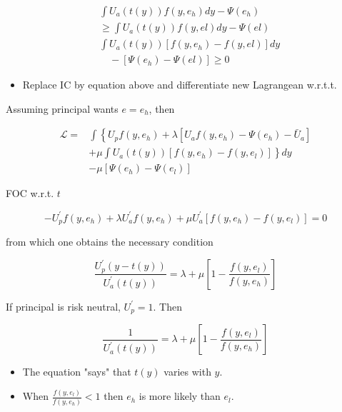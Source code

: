 \documentclass[10pt]{article}
\begin{document}
$$
\begin{aligned}
& \int U_{a}(t(y)) f\left(y, e_{h}\right) d y-\Psi\left(e_{h}\right) \\
& \geq \int U_{a}(t(y)) f(y, e l) d y-\Psi(e l) \\
& \int U_{a}(t(y))\left[f\left(y, e_{h}\right)-f(y, e l)\right] d y \\
& \quad-\left[\Psi\left(e_{h}\right)-\Psi(e l)\right] \geq 0
\end{aligned}
$$

\begin{itemize}
  \item Replace IC by equation above and differentiate new Lagrangean w.r.t.t.
\end{itemize}

Assuming principal wants $e=e_{h}$, then

$$
\begin{aligned}
\mathcal{L}= & \int\left\{U_{p} f\left(y, e_{h}\right)+\lambda\left[U_{a} f\left(y, e_{h}\right)-\Psi\left(e_{h}\right)-\bar{U}_{a}\right]\right. \\
& \left.+\mu \int U_{a}(t(y))\left[f\left(y, e_{h}\right)-f\left(y, e_{l}\right)\right]\right\} d y \\
& -\mu\left[\Psi\left(e_{h}\right)-\Psi\left(e_{l}\right)\right]
\end{aligned}
$$

FOC w.r.t. $t$

$$
-U_{p}^{\prime} f\left(y, e_{h}\right)+\lambda U_{a}^{\prime} f\left(y, e_{h}\right)+\mu U_{a}^{\prime}\left[f\left(y, e_{h}\right)-f\left(y, e_{l}\right)\right]=0
$$

from which one obtains the necessary condition

$$
\frac{U_{p}^{\prime}(y-t(y))}{U_{a}^{\prime}(t(y))}=\lambda+\mu\left[1-\frac{f\left(y, e_{l}\right)}{f\left(y, e_{h}\right)}\right]
$$

If principal is risk neutral, $U_{p}^{\prime}=1$. Then

$$
\frac{1}{U_{a}^{\prime}(t(y))}=\lambda+\mu\left[1-\frac{f\left(y, e_{l}\right)}{f\left(y, e_{h}\right)}\right]
$$

\begin{itemize}
  \item The equation "says" that $t(y)$ varies with $y$.
  \item When $\frac{f\left(y, e_{l}\right)}{f\left(y, e_{h}\right)}<1$ then $e_{h}$ is more likely than $e_{l}$.
\end{itemize}
\end{document}
